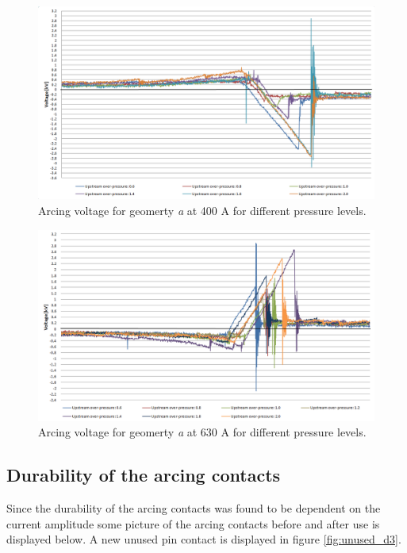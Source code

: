 \documentclass[10pt,a4paper,twoside]{article}
\begin{document}
\begin{figure}[H]
\centering
\includegraphics[scale=0.5]{Bilder/Results/arcingVoltage400Ad4.png}
\caption{Arcing voltage for geomerty \textit{a} at 400 A for different pressure levels.} \label{fig:arcingVoltage400A}
\end{figure}

\begin{figure}[H]
\centering
\includegraphics[scale=0.5]{Bilder/Results/arcingVoltage630Ad4.png}
\caption{Arcing voltage for geomerty \textit{a} at 630 A for different pressure levels.} \label{fig:arcingVoltage630A}
\end{figure}

\subsection{Durability of the arcing contacts} \label{sec:durability}

Since the durability of the arcing contacts was found to be dependent on the current amplitude some picture of the arcing contacts before and after use is displayed below. A new unused pin contact is displayed in figure \ref{fig:unused_d3}.
\end{document}
